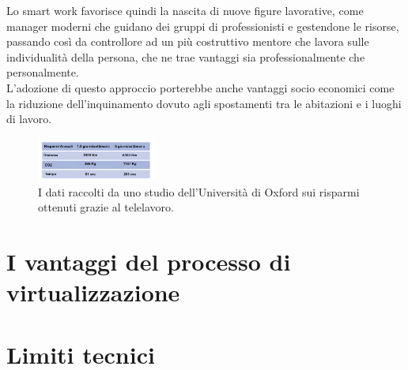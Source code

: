 Lo smart work favorisce quindi la nascita di nuove figure lavorative, come manager moderni che guidano dei gruppi di professionisti e gestendone le risorse, passando così da controllore ad un più costruttivo mentore che lavora sulle individualità della persona, che ne trae vantaggi sia professionalmente che personalmente. \\
L'adozione di questo approccio porterebbe anche vantaggi socio economici come la riduzione dell'inquinamento dovuto agli spostamenti tra le abitazioni e i luoghi di lavoro.  \cite{POL}
\begin{figure}[H]
	\includegraphics[width=0.35\textwidth]{figure/PolData}
	\centering
		\caption{I dati raccolti da uno studio dell'Università di Oxford sui risparmi ottenuti grazie al telelavoro.}
\end{figure}

\section{I vantaggi del processo di virtualizzazione}
\section{Limiti tecnici}


